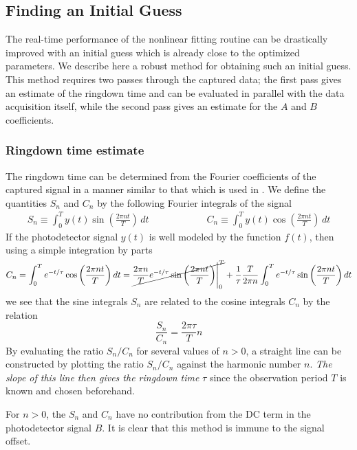 \subsection{Finding an Initial Guess}
The real-time performance of the nonlinear fitting routine can be drastically improved with an initial guess which is already close to the optimized parameters. We describe here a robust method for obtaining such an initial guess. This method requires two passes through the captured data; the first pass gives an estimate of the ringdown time and can be evaluated in parallel with the data acquisition itself, while the second pass gives an estimate for the $A$ and $B$ coefficients.

\subsubsection{Ringdown time estimate}
The ringdown time can be determined from the Fourier coefficients of the captured signal in a manner similar to that which is used in \cite{crds_freq_domain}. We define the quantities $S_n$ and $C_n$ by the following Fourier integrals of the signal
\begin{align}
	S_n \equiv \int_{0}^{T}y(t) \sin \left(\frac{2\pi n t}{T}\right)\, dt
	\qquad\qquad\qquad
	C_n \equiv \int_{0}^{T}y(t) \cos \left(\frac{2\pi n t}{T}\right)\, dt
\end{align}
If the photodetector signal $y(t)$ is well modeled by the function $f(t)$, then using a simple integration by parts
\begin{equation}
	C_n = \int_0^T e^{-t/ \tau} \cos \left( \frac{2 \pi n t}{T} \right) dt
	=
	\cancel{\frac{2 \pi n}{T}  e^{-t/ \tau} \sin \left( \frac{2 \pi n t}{T} \right) \Biggr|_0^T} +
	\frac{1}{\tau} \frac{T}{2 \pi n}  \int_0^T e^{-t/ \tau} \sin \left( \frac{2 \pi n t}{T} \right) dt
\end{equation}
we see that the sine integrals $S_n$ are related to the cosine integrals $C_n$ by the relation
\begin{equation}
	\frac{S_n}{C_n} = \frac{2\pi \tau}{T} n
\end{equation}
By evaluating the ratio $S_n/C_n$ for several values of $n>0$, a straight line can be constructed by plotting the ratio $S_n/C_n$ against the harmonic number $n$. \textit{The slope of this line then gives the ringdown time} $\tau$ since the observation period $T$ is known and chosen beforehand.

For $n>0$, the $S_n$ and $C_n$ have no contribution from the DC term in the photodetector signal $B$. It is clear that this method is immune to the signal offset.

